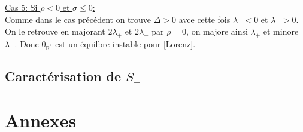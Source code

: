 \documentclass{article}
\newcommand{\R}{\mathbb{R}}
\newtheorem[M]{prop}{Proposition}[section]
\newtheorem[M]{propt}{Propriété}[section]
\newtheorem[L]{thm}{Théoreme}
\newtheorem[L]{cor}{Corollaire}
\begin{document}
\underline{Cas 5: Si $\rho<0$ et $\sigma\le 0$:}\\
Comme dans le cas précédent on trouve $\Delta>0$ avce cette fois $\lambda_+ < 0$ et $\lambda_- >0$. On le retrouve en majorant $2\lambda_+$ et $2\lambda_-$ par $\rho=0$, on majore ainsi $\lambda_+$ et minore $\lambda
_-$. Donc $0_{\R^3}$ est un équilbre instable pour \eqref{Lorenz}.

\subsection{Caractérisation de $S_\pm$}
\section{Annexes}
\end{document}
